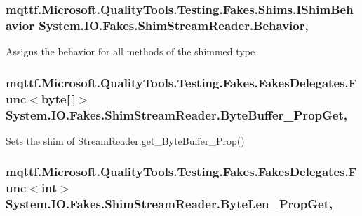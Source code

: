\hypertarget{class_system_1_1_i_o_1_1_fakes_1_1_shim_stream_reader_a65bcbc529e89d83ff2704848cfb3d369}{
\subsubsection[{Behavior}]{\setlength{\rightskip}{0pt plus 5cm}mqttf.\-Microsoft.\-Quality\-Tools.\-Testing.\-Fakes.\-Shims.\-I\-Shim\-Behavior System.\-I\-O.\-Fakes.\-Shim\-Stream\-Reader.\-Behavior\hspace{0.3cm}{\ttfamily [static]}, {\ttfamily [set]}}}\label{class_system_1_1_i_o_1_1_fakes_1_1_shim_stream_reader_a65bcbc529e89d83ff2704848cfb3d369}


Assigns the behavior for all methods of the shimmed type

\hypertarget{class_system_1_1_i_o_1_1_fakes_1_1_shim_stream_reader_a6725ea89a590a081ef31ce6e598b1b84}{
\subsubsection[{Byte\-Buffer\-\_\-\-Prop\-Get}]{\setlength{\rightskip}{0pt plus 5cm}mqttf.\-Microsoft.\-Quality\-Tools.\-Testing.\-Fakes.\-Fakes\-Delegates.\-Func$<$byte\mbox{[}$\,$\mbox{]}$>$ System.\-I\-O.\-Fakes.\-Shim\-Stream\-Reader.\-Byte\-Buffer\-\_\-\-Prop\-Get\hspace{0.3cm}{\ttfamily [get]}, {\ttfamily [set]}}}\label{class_system_1_1_i_o_1_1_fakes_1_1_shim_stream_reader_a6725ea89a590a081ef31ce6e598b1b84}


Sets the shim of Stream\-Reader.\-get\-\_\-\-Byte\-Buffer\-\_\-\-Prop()

\hypertarget{class_system_1_1_i_o_1_1_fakes_1_1_shim_stream_reader_a02b16d880a394a71193d8a0bb71401b6}{
\subsubsection[{Byte\-Len\-\_\-\-Prop\-Get}]{\setlength{\rightskip}{0pt plus 5cm}mqttf.\-Microsoft.\-Quality\-Tools.\-Testing.\-Fakes.\-Fakes\-Delegates.\-Func$<$int$>$ System.\-I\-O.\-Fakes.\-Shim\-Stream\-Reader.\-Byte\-Len\-\_\-\-Prop\-Get\hspace{0.3cm}{\ttfamily [get]}, {\ttfamily [set]}}}\label{class_system_1_1_i_o_1_1_fakes_1_1_shim_stream_reader_a02b16d880a394a71193d8a0bb71401b6}


